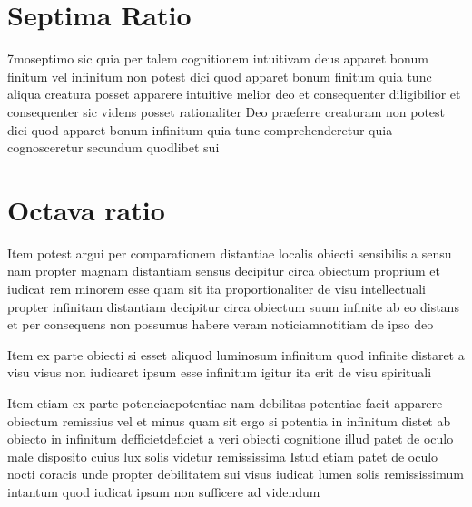 \documentclass[twoside, openright]{report}
\begin{document}
        \bigskip
         \section*{Septima Ratio} 
        \pstart
        7moseptimo sic quia per talem cognitionem intuitivam deus apparet bonum finitum vel infinitum non potest dici quod apparet bonum finitum quia tunc aliqua creatura posset apparere intuitive melior deo et consequenter diligibilior et consequenter sic videns posset rationaliter Deo praeferre creaturam non potest dici quod apparet bonum infinitum quia tunc comprehenderetur quia cognosceretur secundum quodlibet sui
        \pend
      
        \bigskip
         \section*{Octava ratio} 
        \pstart
        Item potest argui per comparationem distantiae localis obiecti sensibilis a sensu nam propter magnam distantiam sensus decipitur circa obiectum proprium et iudicat rem minorem esse quam sit ita proportionaliter de visu intellectuali propter infinitam distantiam decipitur circa obiectum suum infinite ab eo distans et per consequens non possumus habere veram noticiamnotitiam de ipso deo
        \pend
     
        \pstart
        Item ex parte obiecti si esset aliquod luminosum infinitum quod infinite distaret a visu visus non iudicaret ipsum esse infinitum igitur ita erit de visu spirituali
        \pend
     
        \pstart
        Item etiam ex parte potenciaepotentiae  nam debilitas potentiae facit apparere obiectum remissius vel et minus quam sit ergo si potentia in infinitum distet ab obiecto in infinitum defficietdeficiet a veri obiecti cognitione illud patet de oculo male disposito cuius lux solis videtur remississima Istud etiam patet de oculo nocti coracis  unde propter debilitatem sui visus iudicat lumen solis remississimum intantum quod iudicat ipsum non sufficere ad videndum
        \pend
     
\end{document}
